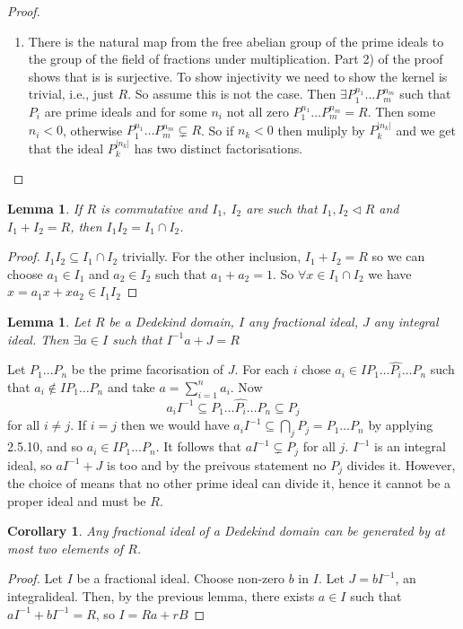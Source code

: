 \documentclass[a4paper,10pt]{article}
\newtheorem{lem}[thm]{Lemma}
\newtheorem{cor}[thm]{Corollary}
\begin{document}
\begin{proof}
\begin{enumerate}
\item There is the natural map from the free abelian group of the prime ideals to the group of the field of fractions under multiplication. Part 2) of the proof shows that is is surjective. To show injectivity we need to show the kernel is trivial, i.e., just $R$. So assume this is not the case. Then $\exists P_{1}^{n_{1}}\ldots P_{m}^{n_{m}}$ such that $P_{i}$ are prime ideals and for some $n_{i}$ not all zero $P_{1}^{n_{1}}\ldots P_{m}^{n_{m}}=R$. Then some $n_{i}<0$, otherwise $P_{1}^{n_{1}}\ldots P_{m}^{n_{m}}\subsetneq R$. So if $n_{k}<0$ then muliply by $P_{k}^{|n_{k}|}$ and we get that the ideal $P_{k}^{|n_{k}|}$ has two distinct factorisations.
\end{enumerate}
\end{proof}

\begin{lem}
If $R$ is commutative and $I_{1},\ I_{2}$ are such that $I_{1},I_{2}\triangleleft R$ and $I_{1}+I_{2}=R$, then $I_{1}I_{2}=I_{1}\cap I_{2}$.
\end{lem}
\begin{proof}
$I_{1}I_{2}\subseteq I_{1}\cap I_{2}$ trivially. For the other inclusion, $I_{1}+I_{2}=R$ so we can choose $a_{1}\in I_{1}$ and $a_{2}\in I_{2}$ such that $a_{1}+a_{2}=1$. So $\forall x\in I_{1}\cap I_{2}$ we have $x=a_{1}x+xa_{2}\in I_{1}I_{2}$
\end{proof}

\begin{lem}
Let $R$ be a Dedekind domain, $I$ any fractional ideal, $J$ any integral ideal. Then $\exists a\in I$ such that $I^{-1}a+J=R$
\end{lem}
Let $P_{1}\ldots P_{n}$ be the prime facorisation of $J$. For each $i$ chose $a_{i}\in IP_{1}\ldots \hat{P_{i}}\ldots P_{n}$ such that $a_{i}\notin IP_{1}\ldots P_{n}$ and take $a=\sum_{i=1}^{n}a_{i}$. Now $$a_{i}I^{-1}\subseteq P_{1}\ldots \hat{P_{i}}\ldots P_{n} \subseteq P_{j}$$ for all $i\neq j$. If $i=j$ then  we would have $a_{i}I^{-1}\subseteq \underset{j}{\bigcap} P_{j}=P_{1}\ldots P_{n}$ by applying 2.5.10, and so $a_{i}\in IP_{1}\ldots P_{n}$. It follows that $aI^{-1}\subsetneq P_{j}$ for all $j$. $I^{-1}$ is an integral ideal, so $aI^{-1}+J$ is too and by the preivous statement no $P_{j}$ divides it. However, the choice of means that no other prime ideal can divide it, hence it cannot be a proper ideal and must be $R$.

\begin{cor}
Any fractional ideal of a Dedekind domain can be generated by at most two elements of $R$.
\end{cor}
\begin{proof}
Let $I$ be a fractional ideal. Choose non-zero $b$ in $I$. Let $J=bI^{-1}$, an integralideal. Then, by the previous lemma, there exists $a\in I$ such that $aI^{-1}+bI^{-1}=R$, so $I=Ra+rB$
\end{proof}
\end{document}
